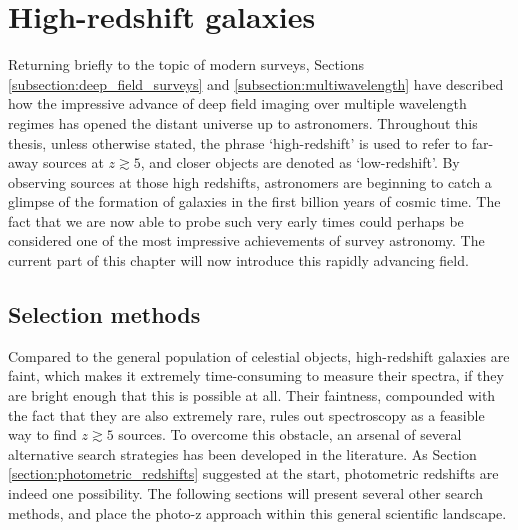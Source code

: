 \section{High-redshift galaxies}\label{section:high_redshift_galaxies}
Returning briefly to the topic of modern surveys, Sections \ref{subsection:deep_field_surveys} and \ref{subsection:multiwavelength} have described how the impressive advance of deep field imaging over multiple wavelength regimes has opened the distant universe up to astronomers. Throughout this thesis, unless otherwise stated, the phrase `high-redshift' is used to refer to far-away sources at $z\gtrsim5$, and closer objects are denoted as `low-redshift'. By observing sources at those high redshifts, astronomers are beginning to catch a glimpse of the formation of galaxies in the first billion years of cosmic time. The fact that we are now able to probe such very early times could perhaps be considered one of the most impressive achievements of survey astronomy. The current part of this chapter will now introduce this rapidly advancing field.  \par




\subsection{Selection methods}\label{subsection:high_z_selection_methods}
Compared to the general population of celestial objects, high-redshift galaxies are faint, which makes it extremely time-consuming to measure their spectra, if they are bright enough that this is possible at all. Their faintness, compounded with the fact that they are also extremely rare, rules out spectroscopy as a feasible way to find $z\gtrsim5$ sources. To overcome this obstacle, an arsenal of several alternative search strategies has been developed in the literature. As Section \ref{section:photometric_redshifts} suggested at the start, photometric redshifts are indeed one possibility. The following sections will present several other search methods, and place the photo-z approach within this general scientific landscape. \par 




